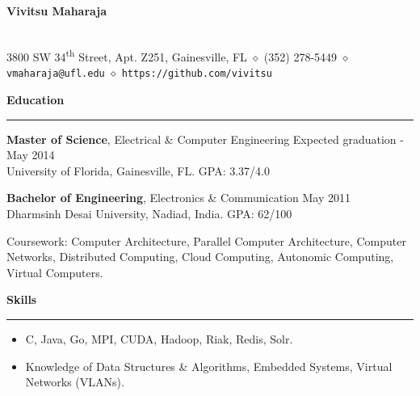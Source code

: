 \documentclass[10pt]{article}
\begin{document}
\begin{center}
\textbf{\Large Vivitsu Maharaja}
\date{}
\thispagestyle{empty}
\smallskip \\
3800 SW 34\textsuperscript{th} Street, Apt. Z251, Gainesville, FL $\diamond$ (352) 278-5449 $\diamond$ \texttt{vmaharaja@ufl.edu} $\diamond$ \texttt{https://github.com/vivitsu}
\end{center}


\textbf{Education}
\smallskip
\hrule
{\bf Master of Science}, Electrical \& Computer Engineering \hfill Expected graduation - May 2014\\
University of Florida, Gainesville, FL. \hfill GPA: 3.37/4.0

{\bf Bachelor of Engineering}, Electronics \& Communication \hfill May 2011\\
Dharmsinh Desai University, Nadiad, India. \hfill GPA: 62/100

Coursework: Computer Architecture, Parallel Computer Architecture, Computer Networks, Distributed Computing, Cloud Computing, Autonomic Computing, Virtual Computers.

\textbf{Skills}
\smallskip
\hrule
\begin{itemize}
    \item C, Java, Go, MPI, CUDA, Hadoop, Riak, Redis, Solr.
    \item Knowledge of Data Structures \& Algorithms, Embedded Systems, Virtual Networks (VLANs).
\end{itemize} 
\end{document}

